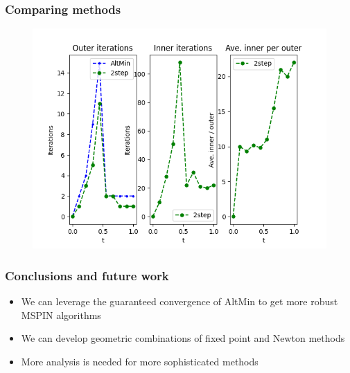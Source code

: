 \documentclass{beamer}
\begin{document}
\begin{frame}
\frametitle{Comparing methods}

\begin{figure}
\includegraphics[width=\textwidth]{FIG_GD_its_2step.png}
\end{figure}
\end{frame}

\begin{frame}
\frametitle{Conclusions and future work}

\begin{itemize}
\item We can leverage the guaranteed convergence of AltMin to get more robust MSPIN algorithms
\item We can develop geometric combinations of fixed point and Newton methods
\item More analysis is needed for more sophisticated methods
\end{itemize}

\end{frame}
\end{document}
